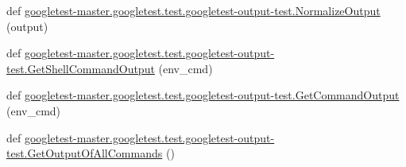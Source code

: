 \begin{DoxyCompactItemize}
\item 
def \mbox{\hyperlink{namespacegoogletest-master_1_1googletest_1_1test_1_1googletest-output-test_acf0af3b4864cbae6643a6d3ec71abcf3}{googletest-\/master.\+googletest.\+test.\+googletest-\/output-\/test.\+Normalize\+Output}} (output)
\item 
def \mbox{\hyperlink{namespacegoogletest-master_1_1googletest_1_1test_1_1googletest-output-test_aa982dca3285605db207fb98817d0c456}{googletest-\/master.\+googletest.\+test.\+googletest-\/output-\/test.\+Get\+Shell\+Command\+Output}} (env\+\_\+cmd)
\item 
def \mbox{\hyperlink{namespacegoogletest-master_1_1googletest_1_1test_1_1googletest-output-test_a36fa313f94b26c52704231f2a0d4e20a}{googletest-\/master.\+googletest.\+test.\+googletest-\/output-\/test.\+Get\+Command\+Output}} (env\+\_\+cmd)
\item 
def \mbox{\hyperlink{namespacegoogletest-master_1_1googletest_1_1test_1_1googletest-output-test_ae53cb6eb6487f7f2f8ed334f9afb0f4e}{googletest-\/master.\+googletest.\+test.\+googletest-\/output-\/test.\+Get\+Output\+Of\+All\+Commands}} ()
\end{DoxyCompactItemize}

